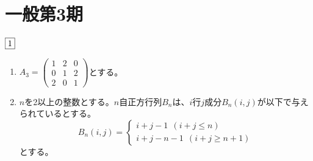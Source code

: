 \documentclass[dvipdfmx]{jsreport}
\begin{document}
\section{一般第3期}
\begin{tcolorbox} %
	$\fbox{1}$
\begin{enumerate}
	\item $A_3= \begin{pmatrix}1& 2& 0\\ 0& 1& 2\\ 2& 0& 1\end{pmatrix}$とする。
	\item $n$を2以上の整数とする。$n$自正方行列$B_n$は、$i$行$j$成分$B_n(i, j)$が以下で与えられているとする。
\begin{equation*}
	B_n({i, j})= 
\begin{cases}
	i+ j- 1\ \ (i+ j\le n)\\
	i+ j- n- 1\ \ (i+ j\ge n+ 1) 
\end{cases}
\end{equation*}
	とする。
\end{enumerate}
\end{tcolorbox}

\begin{souanswer} %

\end{souanswer}
\end{document}
